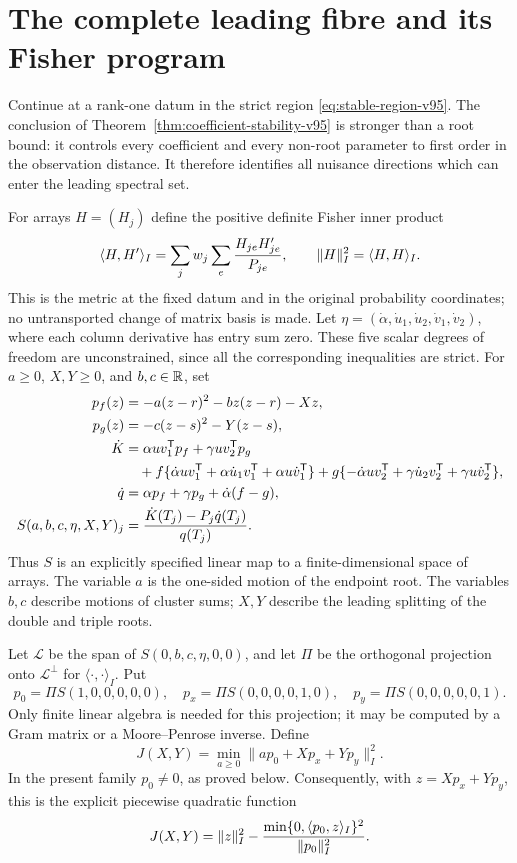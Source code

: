 \section{The complete leading fibre and its Fisher program}
\label{sec:cubic-leading-v95}
Continue at a rank-one datum in the strict region
\eqref{eq:stable-region-v95}. The conclusion of
Theorem~\ref{thm:coefficient-stability-v95} is stronger than a root bound:
it controls every coefficient and every non-root parameter to first
order in the observation distance. It therefore identifies all nuisance
directions which can enter the leading spectral set.

For arrays $H=(H_j)$ define the positive definite Fisher inner product
\[
 \langle H,H'\rangle_I=\sum_jw_j\sum_e{H_{je}H'_{je}\over P_{je}},
 \qquad \|H\|_I^2=\langle H,H\rangle_I.
\]
This is the metric at the fixed datum and in the original probability
coordinates; no untransported change of matrix basis is made. Let
$\eta=(\dot\alpha,\dot u_1,\dot u_2,\dot v_1,\dot v_2)$, where each
column derivative has entry sum zero. These five scalar degrees of
freedom are unconstrained, since all the corresponding inequalities
are strict. For $a\ge0$, $X,Y\ge0$, and $b,c\in\mathbb R$, set
\begin{align}
 p_f(z)&=-a(z-r)^2-bz(z-r)-Xz,\nonumber\\
 p_g(z)&=-c(z-s)^2-Y(z-s),\label{eq:root-jets-v95}\\
 \dot K&=\alpha uv_1^{\mathsf T}p_f+\gamma uv_2^{\mathsf T}p_g\nonumber\\
 &\quad+f\{\dot\alpha uv_1^{\mathsf T}
       +\alpha\dot u_1v_1^{\mathsf T}+\alpha u\dot v_1^{\mathsf T}\}
   +g\{-\dot\alpha uv_2^{\mathsf T}
       +\gamma\dot u_2v_2^{\mathsf T}+\gamma u\dot v_2^{\mathsf T}\},
       \nonumber\\
 \dot q&=\alpha p_f+\gamma p_g+\dot\alpha(f-g),\nonumber\\
 S(a,b,c,\eta,X,Y)_j
   &={\dot K(T_j)-P_j\dot q(T_j)\over q(T_j)}.
       \label{eq:score-v95}
\end{align}
Thus $S$ is an explicitly specified linear map to a finite-dimensional
space of arrays. The variable $a$ is the one-sided motion of the
endpoint root. The variables $b,c$ describe motions of cluster sums;
$X,Y$ describe the leading splitting of the double and triple roots.

Let $\mathcal L$ be the span of $S(0,b,c,\eta,0,0)$, and let $\Pi$
be the orthogonal projection onto $\mathcal L^\perp$ for
$\langle\cdot,\cdot\rangle_I$. Put
\[
 p_0=\Pi S(1,0,0,0,0,0),\quad
 p_x=\Pi S(0,0,0,0,1,0),\quad
 p_y=\Pi S(0,0,0,0,0,1).
\]
Only finite linear algebra is needed for this projection; it may be
computed by a Gram matrix or a Moore--Penrose inverse. Define
\begin{equation}\label{eq:J-v95}
 J(X,Y)=\min_{a\ge0}\|a p_0+Xp_x+Yp_y\|_I^2.
\end{equation}
In the present family $p_0\ne0$, as proved below. Consequently, with
$z=Xp_x+Yp_y$, this is the explicit piecewise quadratic function
\begin{equation}\label{eq:J-explicit-v95}
 J(X,Y)=\|z\|_I^2-
 {\min\{0,\langle p_0,z\rangle_I\}^2\over\|p_0\|_I^2}.
\end{equation}

